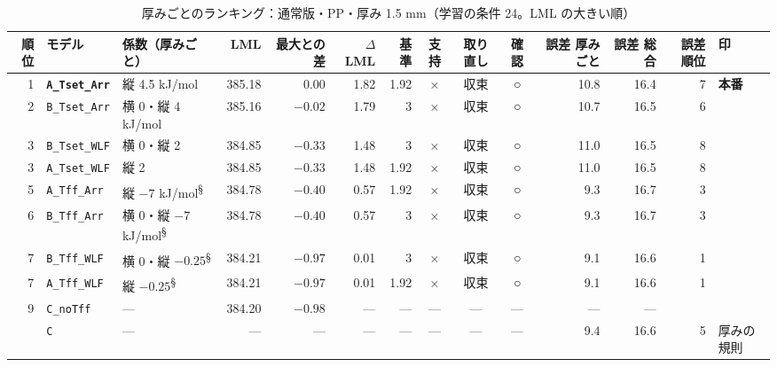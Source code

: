 \documentclass[paper=a4paper,landscape,fontsize=10pt,line_length=62zw,number_of_lines=34]{jlreq}
\let\origtextbf\textbf
\renewcommand{\textbf}[1]{\origtextbf{\gtfamily #1}}   %
\begin{document}
\begin{table}[H]\centering\footnotesize
\caption{厚みごとのランキング：通常版・PP・厚み 1.5 mm（学習の条件 24。LML の大きい順）}
\begin{tabular}{rlp{11\zw}rrrrccc rrrl}
\toprule
順位 & モデル & 係数（厚みごと） & LML & 最大との差 & $\Delta$LML & 基準 & 支持 & 取り直し & 確認 & 誤差 厚みごと & 誤差 総合 & 誤差順位 & 印 \\
\midrule
1 & \textbf{\texttt{A\_\allowbreak{}Tset\_\allowbreak{}Arr}} & 縦 4.5 kJ/mol & 385.18 & 0.00 & 1.82 & 1.92 & × & 収束 & ○ & 10.8 & 16.4 & 7 & \textbf{本番} \\
2 & \texttt{B\_\allowbreak{}Tset\_\allowbreak{}Arr} & 横 0・縦 4 kJ/mol & 385.16 & $-0.02$ & 1.79 & 3 & × & 収束 & ○ & 10.7 & 16.5 & 6 &  \\
3 & \texttt{B\_\allowbreak{}Tset\_\allowbreak{}WLF} & 横 0・縦 2 & 384.85 & $-0.33$ & 1.48 & 3 & × & 収束 & ○ & 11.0 & 16.5 & 8 &  \\
3 & \texttt{A\_\allowbreak{}Tset\_\allowbreak{}WLF} & 縦 2 & 384.85 & $-0.33$ & 1.48 & 1.92 & × & 収束 & ○ & 11.0 & 16.5 & 8 &  \\
5 & \texttt{A\_\allowbreak{}Tff\_\allowbreak{}Arr} & 縦 $-7$ kJ/mol\textsuperscript{§} & 384.78 & $-0.40$ & 0.57 & 1.92 & × & 収束 & ○ & 9.3 & 16.7 & 3 &  \\
6 & \texttt{B\_\allowbreak{}Tff\_\allowbreak{}Arr} & 横 0・縦 $-7$ kJ/mol\textsuperscript{§} & 384.78 & $-0.40$ & 0.57 & 3 & × & 収束 & ○ & 9.3 & 16.7 & 3 &  \\
7 & \texttt{B\_\allowbreak{}Tff\_\allowbreak{}WLF} & 横 0・縦 $-0.25$\textsuperscript{§} & 384.21 & $-0.97$ & 0.01 & 3 & × & 収束 & ○ & 9.1 & 16.6 & 1 &  \\
7 & \texttt{A\_\allowbreak{}Tff\_\allowbreak{}WLF} & 縦 $-0.25$\textsuperscript{§} & 384.21 & $-0.97$ & 0.01 & 1.92 & × & 収束 & ○ & 9.1 & 16.6 & 1 &  \\
9 & \texttt{C\_\allowbreak{}noTff} & --- & 384.20 & $-0.98$ & --- & --- & --- & --- & --- & --- & --- &  &  \\
 & \texttt{C} & --- & --- & --- & --- & --- & --- & --- & --- & 9.4 & 16.6 & 5 & 厚みの規則 \\
\bottomrule
\end{tabular}
\end{table}
\end{document}
